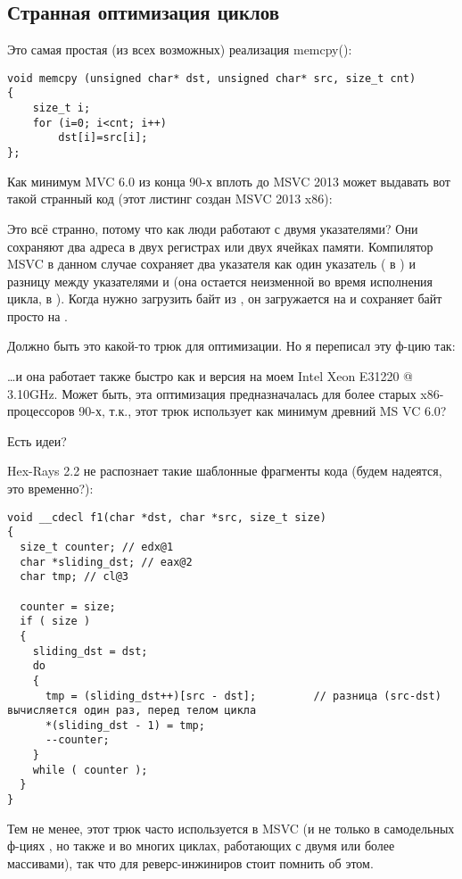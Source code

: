 \subsection{Странная оптимизация циклов}

Это самая простая (из всех возможных) реализация memcpy():

\begin{lstlisting}[style=customc]
void memcpy (unsigned char* dst, unsigned char* src, size_t cnt)
{
	size_t i;
	for (i=0; i<cnt; i++)
		dst[i]=src[i];
};
\end{lstlisting}

Как минимум MVC 6.0 из конца 90-х вплоть до MSVC 2013 может выдавать вот такой странный код (этот листинг создан MSVC 2013
x86):



Это всё странно, потому что как люди работают с двумя указателями? Они сохраняют два адреса в двух регистрах или двух
ячейках памяти.
Компилятор MSVC в данном случае сохраняет два указателя как один указатель ( в \EAX)
и разницу между указателями  и  (она остается неизменной во время исполнения цикла, в \ESI).
Когда нужно загрузить байт из , он загружается на  и сохраняет байт просто на
.

Должно быть это какой-то трюк для оптимизации. Но я переписал эту ф-цию так:



\dots и она работает также быстро как и  версия на моем Intel Xeon E31220 @ 3.10GHz.
Может быть, эта оптимизация предназначалась для более старых x86-процессоров 90-х, т.к., этот трюк использует
как минимум древний MS VC 6.0?

Есть идеи?

Hex-Rays 2.2 не распознает такие шаблонные фрагменты кода (будем надеятся, это временно?):

\begin{lstlisting}[style=customc]
void __cdecl f1(char *dst, char *src, size_t size)
{
  size_t counter; // edx@1
  char *sliding_dst; // eax@2
  char tmp; // cl@3

  counter = size;
  if ( size )
  {
    sliding_dst = dst;
    do
    {
      tmp = (sliding_dst++)[src - dst];         // разница (src-dst) вычисляется один раз, перед телом цикла
      *(sliding_dst - 1) = tmp;
      --counter;
    }
    while ( counter );
  }
}
\end{lstlisting}

Тем не менее, этот трюк часто используется в MSVC (и не только в самодельных ф-циях , но также и во многих
циклах, работающих с двумя или более массивами), так что для реверс-инжиниров стоит помнить об этом.


